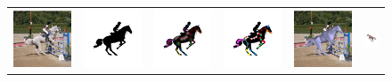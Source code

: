 \begin{figure}[h!]
\begin{tabular}{cccccc}
\includegraphics[trim={0 0.5cm 0 0.5cm},clip,width=0.16\linewidth]{res_horse_new/rgb.jpg} & 
\includegraphics[trim={0 0.5cm 0 0.5cm},clip,width=0.16\linewidth]{res_horse_new/target.jpg} & 
\includegraphics[trim={0 0.5cm 0 0.5cm},clip,width=0.16\linewidth]{res_horse_new/heatmap.jpg} & 
\includegraphics[trim={0 0.5cm 0 0.5cm},clip,width=0.16\linewidth]{res_horse_new/cleaned_skeleton_sil.jpg} &
\includegraphics[trim={0 0.5cm 0 0.5cm},clip,width=0.16\linewidth]{res_horse_new/3d_fit_overlay_rgb.jpg} & 
\includegraphics[trim={0 0.5cm 0 0.5cm},clip,width=0.16\linewidth]{res_horse_new/3d_fit_reversed.jpg} \\


\end{tabular}
\end{figure}
